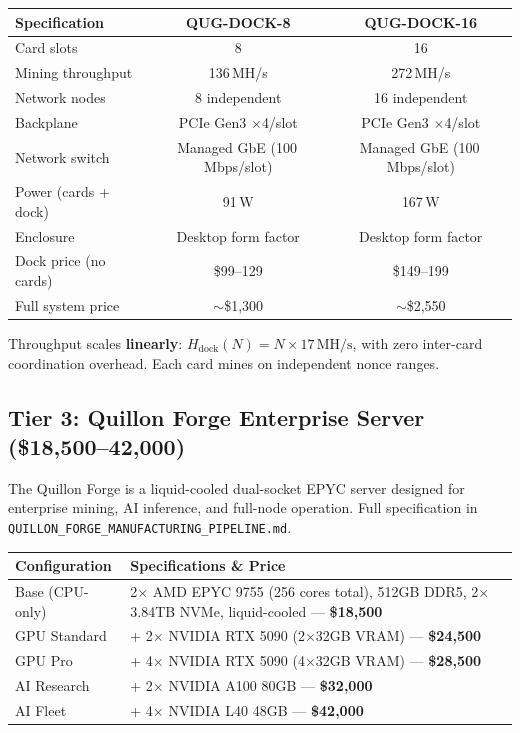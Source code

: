 \documentclass[11pt,a4paper]{article}
\begin{document}
\begin{center}
\begin{tabular}{@{}lcc@{}}
\toprule
\textbf{Specification} & \textbf{QUG-DOCK-8} & \textbf{QUG-DOCK-16} \\
\midrule
Card slots & 8 & 16 \\
Mining throughput & 136\,MH/s & 272\,MH/s \\
Network nodes & 8 independent & 16 independent \\
Backplane & PCIe Gen3 $\times$4/slot & PCIe Gen3 $\times$4/slot \\
Network switch & Managed GbE (100\,Mbps/slot) & Managed GbE (100\,Mbps/slot) \\
Power (cards + dock) & 91\,W & 167\,W \\
Enclosure & Desktop form factor & Desktop form factor \\
Dock price (no cards) & \$99--129 & \$149--199 \\
Full system price & $\sim$\$1{,}300 & $\sim$\$2{,}550 \\
\bottomrule
\end{tabular}
\end{center}

Throughput scales \textbf{linearly}: $H_{\text{dock}}(N) = N \times 17\,\text{MH/s}$, with zero inter-card coordination overhead. Each card mines on independent nonce ranges.

\subsection{Tier 3: Quillon Forge Enterprise Server (\$18,500--42,000)}

The Quillon Forge is a liquid-cooled dual-socket EPYC server designed for enterprise mining, AI inference, and full-node operation. Full specification in \texttt{QUILLON\_FORGE\_MANUFACTURING\_PIPELINE.md}.

\begin{center}
\begin{tabular}{@{}lp{9cm}@{}}
\toprule
\textbf{Configuration} & \textbf{Specifications \& Price} \\
\midrule
Base (CPU-only) & 2$\times$ AMD EPYC 9755 (256 cores total), 512GB DDR5, 2$\times$3.84TB NVMe, liquid-cooled --- \textbf{\$18,500} \\
GPU Standard & + 2$\times$ NVIDIA RTX 5090 (2$\times$32GB VRAM) --- \textbf{\$24,500} \\
GPU Pro & + 4$\times$ NVIDIA RTX 5090 (4$\times$32GB VRAM) --- \textbf{\$28,500} \\
AI Research & + 2$\times$ NVIDIA A100 80GB --- \textbf{\$32,000} \\
AI Fleet & + 4$\times$ NVIDIA L40 48GB --- \textbf{\$42,000} \\
\bottomrule
\end{tabular}
\end{center}
\end{document}

